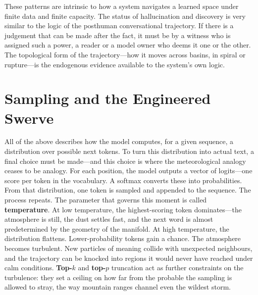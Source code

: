 These patterns are intrinsic to how a system navigates a learned space under finite data and finite capacity. The status of hallucination and discovery is very similar to the logic of the posthuman conversational trajectory. If there is a judgement that can be made after the fact, it must be by a witness who is assigned such a power, a reader or a model owner who deems it one or the other. The topological form of the trajectory---how it moves across basins, in spiral or rupture---is the endogenous evidence available to the system's own logic.


\section{Sampling and the Engineered Swerve}
All of the above describes how the model computes, for a given sequence, a distribution over possible next tokens. To turn this distribution into actual text, a final choice must be made---and this choice is where the meteorological analogy ceases to be analogy.
For each position, the model outputs a vector of logits---one score per token in the vocabulary. A softmax converts these into probabilities. From that distribution, one token is sampled and appended to the sequence. The process repeats.
The parameter that governs this moment is called \textbf{temperature}. At low temperature, the highest-scoring token dominates---the atmosphere is still, the dust settles fast, and the next word is almost predetermined by the geometry of the manifold. At high temperature, the distribution flattens. Lower-probability tokens gain a chance. The atmosphere becomes turbulent. New particles of meaning collide with unexpected neighbours, and the trajectory can be knocked into regions it would never have reached under calm conditions. \textbf{Top-$k$} and \textbf{top-$p$} truncation act as further constraints on the turbulence: they set a ceiling on how far from the probable the sampling is allowed to stray, the way mountain ranges channel even the wildest storm.

